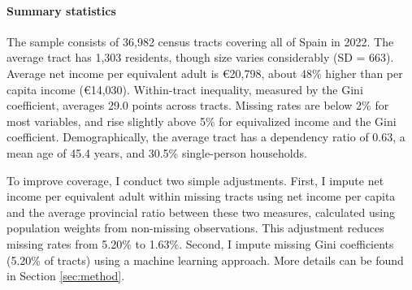 \paragraph{Summary statistics} The sample consists of 36,982 census tracts covering all of Spain in 2022. The average tract has 1,303 residents, though size varies considerably (SD = 663). Average net income per equivalent adult is €20,798, about 48\% higher than per capita income (€14,030). Within-tract inequality, measured by the Gini coefficient, averages 29.0 points across tracts. Missing rates are below 2\% for most variables, and rise slightly above 5\% for equivalized income and the Gini coefficient. Demographically, the average tract has a dependency ratio of 0.63, a mean age of 45.4 years, and 30.5\% single-person households.

\begin{table}[H]
\centering
{}
\end{table}

To improve coverage, I conduct two simple adjustments. First, I impute net income per equivalent adult within missing tracts using net income per capita and the average provincial ratio between these two measures, calculated using population weights from non-missing observations. This adjustment reduces missing rates from 5.20\% to 1.63\%. Second, I impute missing Gini coefficients (5.20\% of tracts) using a machine learning approach. More details can be found in Section \ref{sec:method}.